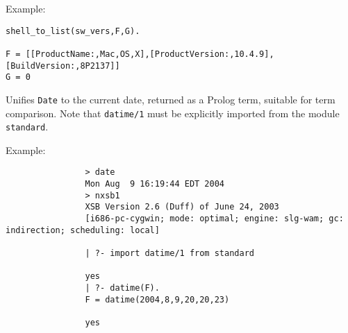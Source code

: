 \begin{description}
Example:
\begin{verbatim}
shell_to_list(sw_vers,F,G).

F = [[ProductName:,Mac,OS,X],[ProductVersion:,10.4.9],[BuildVersion:,8P2137]]
G = 0
\end{verbatim}


Unifies {\tt Date} to the current date, returned as a Prolog term,
suitable for term comparison.  Note that {\tt datime/1} must be
explicitly imported from the module {\tt standard}.

Example:
{\footnotesize
\begin{verbatim}
                > date
                Mon Aug  9 16:19:44 EDT 2004
                > nxsb1
                XSB Version 2.6 (Duff) of June 24, 2003
                [i686-pc-cygwin; mode: optimal; engine: slg-wam; gc: indirection; scheduling: local]

                | ?- import datime/1 from standard

                yes
                | ?- datime(F).
                F = datime(2004,8,9,20,20,23)

                yes
\end{verbatim}}

\end{description}

